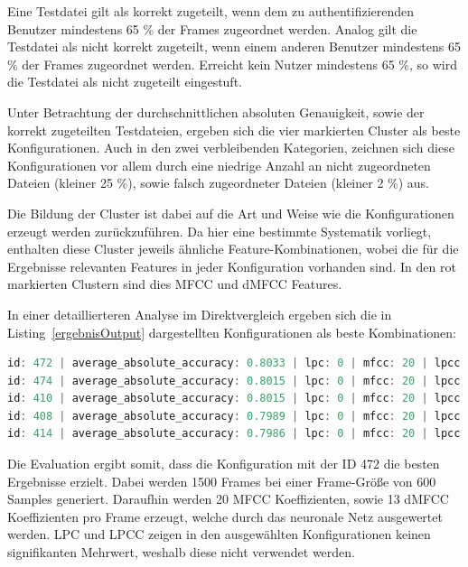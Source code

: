 Eine Testdatei gilt als korrekt zugeteilt, wenn dem zu authentifizierenden Benutzer mindestens 65 \% der Frames zugeordnet werden.
Analog gilt die Testdatei als nicht korrekt zugeteilt, wenn einem anderen Benutzer mindestens 65 \% der Frames zugeordnet werden.
Erreicht kein Nutzer mindestens 65 \%, so wird die Testdatei als nicht zugeteilt eingestuft.

Unter Betrachtung der durchschnittlichen absoluten Genauigkeit, sowie der korrekt zugeteilten Testdateien, ergeben sich die vier markierten Cluster als beste Konfigurationen.
Auch in den zwei verbleibenden Kategorien, zeichnen sich diese Konfigurationen vor allem durch eine niedrige Anzahl an nicht zugeordneten Dateien (kleiner 25 \%), sowie falsch zugeordneter Dateien (kleiner 2 \%) aus.

Die Bildung der Cluster ist dabei auf die Art und Weise wie die Konfigurationen erzeugt werden zurückzuführen.
Da hier eine bestimmte Systematik vorliegt, enthalten diese Cluster jeweils ähnliche Feature-Kombinationen, wobei die für die Ergebnisse relevanten Features in jeder Konfiguration vorhanden sind.
In den rot markierten Clustern sind dies \ac{MFCC} und \ac{dMFCC} Features.

In einer detaillierteren Analyse im Direktvergleich ergeben sich die in Listing~\ref{ergebnisOutput} dargestellten Konfigurationen als beste Kombinationen:
\begin{lstlisting}[language=JavaScript,numbers=none,caption=Auswertung der Konfigurationen,label=ergebnisOutput]
id: 472 | average_absolute_accuracy: 0.8033 | lpc: 0 | mfcc: 20 | lpcc:  0 | delta_mfcc: 13
id: 474 | average_absolute_accuracy: 0.8015 | lpc: 0 | mfcc: 20 | lpcc: 13 | delta_mfcc: 13
id: 410 | average_absolute_accuracy: 0.8015 | lpc: 0 | mfcc: 20 | lpcc: 13 | delta_mfcc: 13
id: 408 | average_absolute_accuracy: 0.7989 | lpc: 0 | mfcc: 20 | lpcc:  0 | delta_mfcc: 13
id: 414 | average_absolute_accuracy: 0.7986 | lpc: 0 | mfcc: 20 | lpcc: 13 | delta_mfcc: 13
\end{lstlisting}

Die Evaluation ergibt somit, dass die Konfiguration mit der ID 472 die besten Ergebnisse erzielt.
Dabei werden 1500 Frames bei einer Frame-Größe von 600 Samples generiert.
Daraufhin werden 20 \ac{MFCC} Koeffizienten, sowie 13 \ac{dMFCC} Koeffizienten pro Frame erzeugt, welche durch das neuronale Netz ausgewertet werden.
\ac{LPC} und \ac{LPCC} zeigen in den ausgewählten Konfigurationen keinen signifikanten Mehrwert, weshalb diese nicht verwendet werden.